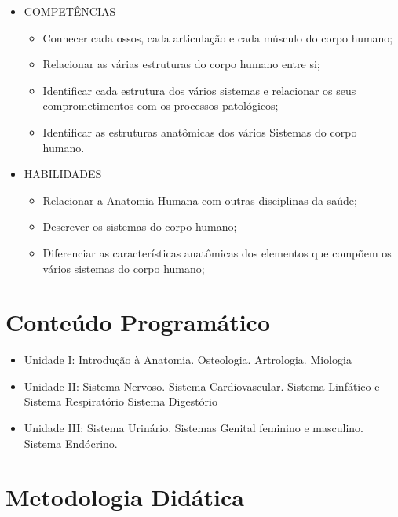 \documentclass[
]{book}
\providecommand{\tightlist}{%
  \setlength{\itemsep}{0pt}\setlength{\parskip}{0pt}}
\begin{document}
\begin{itemize}
\tightlist
\item
  COMPETÊNCIAS

  \begin{itemize}
  \tightlist
  \item
    Conhecer cada ossos, cada articulação e cada músculo do corpo humano;
  \item
    Relacionar as várias estruturas do corpo humano entre si;
  \item
    Identificar cada estrutura dos vários sistemas e relacionar os seus comprometimentos com os processos patológicos;
  \item
    Identificar as estruturas anatômicas dos vários Sistemas do corpo humano.
  \end{itemize}
\item
  HABILIDADES

  \begin{itemize}
  \tightlist
  \item
    Relacionar a Anatomia Humana com outras disciplinas da saúde;
  \item
    Descrever os sistemas do corpo humano;
  \item
    Diferenciar as características anatômicas dos elementos que compõem os vários sistemas do corpo humano;
  \end{itemize}
\end{itemize}

\hypertarget{conteuxfado-programuxe1tico}{%
\section{Conteúdo Programático}\label{conteuxfado-programuxe1tico}}

\begin{itemize}
\tightlist
\item
  Unidade I: Introdução à Anatomia. Osteologia. Artrologia. Miologia
\item
  Unidade II: Sistema Nervoso. Sistema Cardiovascular. Sistema Linfático e Sistema Respiratório Sistema Digestório
\item
  Unidade III: Sistema Urinário. Sistemas Genital feminino e masculino. Sistema Endócrino.
\end{itemize}

\hypertarget{metodologia-diduxe1tica}{%
\section{Metodologia Didática}\label{metodologia-diduxe1tica}}
\end{document}
